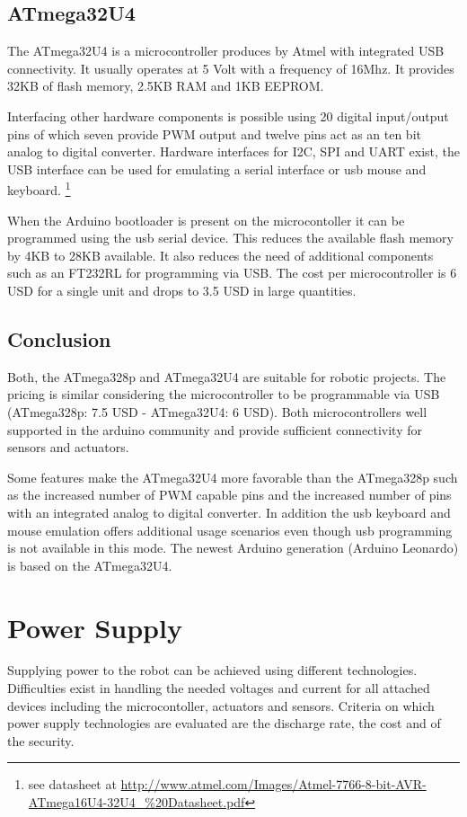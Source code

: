 \subsection{ATmega32U4}
The ATmega32U4 is a microcontroller produces by Atmel with integrated USB connectivity. It usually operates at 5 Volt with a frequency of 16Mhz. It provides 32KB of flash memory, 2.5KB RAM and 1KB EEPROM. 

Interfacing other hardware components is possible using 20 digital input/output pins of which seven provide PWM output and twelve pins act as an ten bit analog to digital converter. Hardware interfaces for I2C, SPI and UART exist, the USB interface can be used for emulating a serial interface or usb mouse and keyboard. \footnote{see datasheet at \url{http://www.atmel.com/Images/Atmel-7766-8-bit-AVR-ATmega16U4-32U4_\%20Datasheet.pdf}}

When the Arduino bootloader is present on the microcontoller it can be programmed using the usb serial device. This reduces the available flash memory by 4KB to 28KB available. It also reduces the need of additional components such as an FT232RL for programming via USB. The cost per microcontroller is 6 USD for a single unit and drops to 3.5 USD in large quantities.
\subsection{Conclusion}
Both, the ATmega328p and ATmega32U4 are suitable for robotic projects. The pricing is similar considering the microcontroller to be programmable via USB (ATmega328p: 7.5 USD - ATmega32U4: 6 USD). Both microcontrollers well supported in the arduino community and provide sufficient connectivity for sensors and actuators.  

Some features make the ATmega32U4 more favorable than the ATmega328p such as the increased number of PWM capable pins and the increased number of pins with an integrated analog to digital converter. In addition the usb keyboard and mouse emulation offers additional usage scenarios even though usb programming is not available in this mode. The newest Arduino generation (Arduino Leonardo) is based on the ATmega32U4.
\section{Power Supply}
Supplying power to the robot can be achieved using different technologies. Difficulties exist in handling the needed voltages and current for all attached devices including the microcontoller, actuators and sensors. Criteria on which power supply technologies are evaluated are the discharge rate, the cost and of the security.
